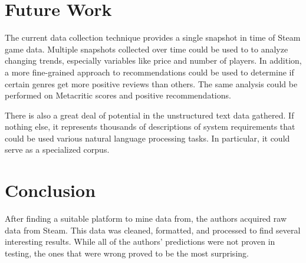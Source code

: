 \documentclass[letterpaper,10pt,twocolumn]{article}
\begin{document}
\section{Future Work}

The current data collection technique provides a single snapshot in time of
Steam game data. Multiple snapshots collected over time could be used to to
analyze changing trends, especially variables like price and number of
players. In addition, a more fine-grained approach to recommendations could be
used to determine if certain genres get more positive reviews than others. The
same analysis could be performed on Metacritic scores and positive
recommendations.

There is also a great deal of potential in the unstructured text data gathered.
If nothing else, it represents thousands of descriptions of system requirements
that could be used various natural language processing tasks. In particular, it
could serve as a specialized corpus.


\section{Conclusion}

After finding a suitable platform to mine data from, the authors acquired raw
data from Steam. This data was cleaned, formatted, and processed to find
several interesting results. While all of the authors' predictions were not
proven in testing, the ones that were wrong proved to be the most surprising.


\nocite{*}                                 %
\printbibliography

\end{document}
